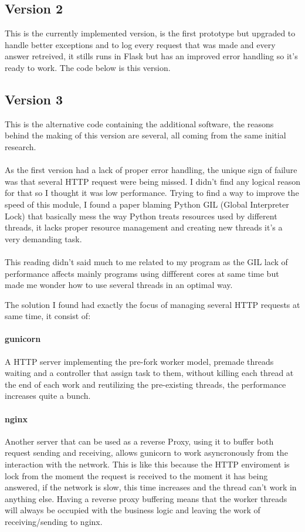 \subsection{Version 2}
This is the currently implemented version, is the first prototype but upgraded to handle better exceptions and to log every request that was made and every answer retreived, it stills runs in Flask but has an improved error handling so it's ready to work. The code below is this version.

\subsection{Version 3}
This is the alternative code containing the additional software, the reasons behind the making of this version are several, all coming from the same initial research.

\paragraph{}
As the first version had a lack of proper error handling, the unique sign of failure was that several HTTP request were being missed.
I didn't find any logical reason for that so I thought it was low performance. Trying to find a way to improve the speed of this module, I found a paper blaming Python GIL (Global Interpreter Lock) that basically mess the way Python treats resources used by different threads, it lacks proper resource management and creating new threads it's a very demanding task.

\paragraph{}This reading didn't said much to me related to my program as the GIL lack of performance affects mainly programs using diffferent cores at same time but made me wonder how to use several threads in an optimal way.

The solution I found had exactly the focus of managing several HTTP requests at same time, it consist of:
\paragraph{gunicorn}
A HTTP server implementing the pre-fork worker model, premade threads waiting and a controller that assign task to them, without killing each thread at the end of each work and reutilizing the pre-existing threads, the performance increases quite a bunch.
\paragraph{nginx}
Another server that can be used as a reverse Proxy, using it to buffer both request sending and receiving, allows gunicorn to work asyncronously from the interaction with the network. This is like this because the HTTP enviroment is lock from the moment the request is received to the moment it has being answered, if the network is slow, this time increases and the thread can't work in anything else.
Having a reverse proxy buffering means that the worker threads will always be occupied with the business logic and leaving the work of receiving/sending to nginx.

